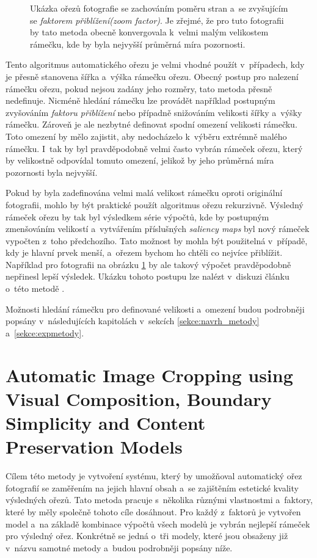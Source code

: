 \begin{figure}[H]
\caption{Ukázka ořezů fotografie se zachováním poměru stran a~se zvyšujícím se \emph{faktorem přiblížení(zoom factor)}. Je zřejmé, že pro tuto fotografii by tato metoda obecně konvergovala k~velmi malým velikostem rámečku, kde by byla nejvyšší průměrná míra pozornosti.}
\label{obr:zoomFactors}
\end{figure}

Tento algoritmus automatického ořezu je velmi vhodné použít v~případech, kdy je přesně stanovena šířka a~výška rámečku ořezu. Obecný postup pro nalezení rámečku ořezu, pokud nejsou zadány jeho rozměry, tato metoda přesně nedefinuje. Nicméně hledání rámečku lze provádět například postupným zvyšováním \emph{faktoru přiblížení} nebo případně snižováním velikosti šířky a~výšky rámečku. Zároveň je ale nezbytné definovat spodní omezení velikosti rámečku. Toto omezení by mělo zajistit, aby nedocházelo k~výběru extrémně malého rámečku. I~tak by byl pravděpodobně velmi často vybrán rámeček ořezu, který by velikostně odpovídal tomuto omezení, jelikož by jeho průměrná míra pozornosti byla nejvyšší.

Pokud by byla zadefinována velmi malá velikost rámečku oproti originální fotografii, mohlo by být praktické použít algoritmus ořezu rekurzivně. Výsledný rámeček ořezu by tak byl výsledkem série výpočtů, kde by postupným zmenšováním velikostí a~vytvářením příslušných \emph{saliency maps} byl nový rámeček vypočten z~toho předchozího. Tato možnost by mohla být použitelná v~případě, kdy je hlavní prvek menší, a~ořezem bychom ho chtěli co nejvíce přiblížit. Například pro fotografii na obrázku \ref{obr:zoomFactors} by ale takový výpočet pravděpodobně nepřinesl lepší výsledek. Ukázku tohoto postupu lze nalézt v~diskuzi článku o~této metodě \cite{Stentiford2007}.

Možnosti hledání rámečku pro definované velikosti a~omezení budou podrobněji popsány v~následujících kapitolách v~sekcích \ref{sekce:navrh_metody} a~\ref{sekce:expmetody}.

\section{Automatic Image Cropping using Visual Composition, Boundary Simplicity and Content Preservation Models} \label{sekce:fang}
Cílem této metody \cite{Fang2014} je vytvoření systému, který by umožňoval automatický ořez fotografií se zaměřením na jejich hlavní obsah a~se zajištěním estetické kvality výsledných ořezů. Tato metoda pracuje s~několika různými vlastnostmi a~faktory, které by měly společně tohoto cíle dosáhnout. Pro každý z~faktorů je vytvořen model a~na základě kombinace výpočtů všech modelů je vybrán nejlepší rámeček pro výsledný ořez. Konkrétně se jedná o~tři modely, které jsou obsaženy již v~názvu samotné metody a~budou podrobněji popsány níže.

